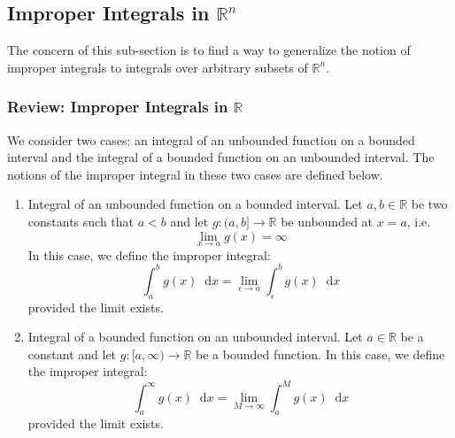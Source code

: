 \documentclass[11pt, a4paper]{article}
\newcommand{\diff}{\mathop{}\!\mathrm{d}} %
\begin{document}
\subsection{Improper Integrals in $ \mathbb{R}^n $}

The concern of this sub-section is to find a way to generalize the notion of improper integrals to integrals over arbitrary subsets of $ \mathbb{R}^n $.

\subsubsection{Review: Improper Integrals in $ \mathbb{R} $}
We consider two cases: an integral of an unbounded function on a bounded interval and the integral of a bounded function on an unbounded interval. The notions of the improper integral in these two cases are defined below.
\begin{enumerate}
	\item Integral of an unbounded function on a bounded interval. Let $ a, b \in \mathbb{R} $ be two constants such that $ a < b $ and let $ g: (a, b] \rightarrow \mathbb{R} $ be unbounded at $ x = a $, i.e.
	\begin{equation*}
	\lim_{x \rightarrow a} g(x) = \infty
	\end{equation*}
	In this case, we define the improper integral:
	\begin{equation*}
		\int_{a}^{b} g(x) \diff x = \lim_{\epsilon \rightarrow a} \int_{\epsilon}^{b} g(x) \diff x
	\end{equation*}
	provided the limit exists. 
	
	\item Integral of a bounded function on an unbounded interval. Let $ a \in \mathbb{R} $ be a constant and let $ g: [a, \infty) \rightarrow \mathbb{R} $ be a bounded function. In this case, we define the improper integral:
	\begin{equation*}
		\int_{a}^{\infty} g(x) \diff x = \lim_{M \rightarrow \infty} \int_{a}^{M} g(x) \diff x
	\end{equation*}
	provided the limit exists. 
	
\end{enumerate}
\end{document}

